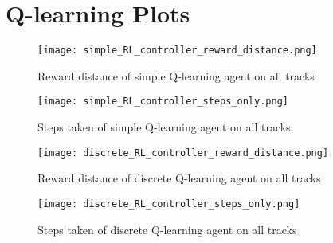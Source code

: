 \documentclass{article}
\begin{document}
\appendix

\section{Q-learning Plots}
\label{qlearning_plots}

\begin{figure}[htbp]
    \centering
    \texttt{[image: simple\_RL\_controller\_reward\_distance.png]}
    \caption{Reward distance of simple Q-learning agent on all tracks}
    \label{simple_RL_controller_reward_distance}
\end{figure}

\begin{figure}[htbp]
    \centering
    \texttt{[image: simple\_RL\_controller\_steps\_only.png]}
    \caption{Steps taken of simple Q-learning agent on all tracks}
    \label{simple_RL_controller_steps_only}
\end{figure}


\begin{figure}[htbp]
    \centering
    \texttt{[image: discrete\_RL\_controller\_reward\_distance.png]}
    \caption{Reward distance of discrete Q-learning agent on all tracks}
    \label{discrete_RL_controller_reward_distance}
\end{figure}

\begin{figure}[htbp]
    \centering
    \texttt{[image: discrete\_RL\_controller\_steps\_only.png]}
    \caption{Steps taken of discrete Q-learning agent on all tracks}
    \label{discrete_RL_controller_steps_only}
\end{figure}
\end{document}
